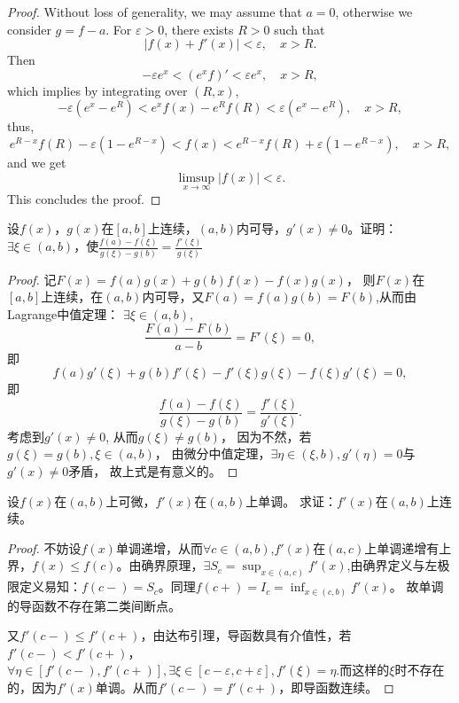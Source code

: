   \begin{proof}
    Without loss of generality, we may assume that $a=0$, otherwise we consider $g=f-a$.
  For $\varepsilon>0$, there exists $R>0$ such that 
  \[
  |f(x)+f'(x)| < \varepsilon,\quad x>R.
  \]
  Then 
  \[
  -\varepsilon e^x < \left(e^xf\right)' < \varepsilon e^x,\quad x>R,
  \]
  which implies by integrating over $(R, x)$,
  \[
  -\varepsilon (e^x - e^R) < e^xf(x) - e^Rf(R) < \varepsilon(e^x-e^R),\quad x>R,
  \]
  thus,
  \[
  e^{R-x}f(R) - \varepsilon(1-e^{R-x}) < f(x) < e^{R-x}f(R) + \varepsilon(1-e^{R-x}), \quad x>R,
  \]
  and we get 
  \[
  \limsup_{x\to\infty}|f(x)| < \varepsilon.
  \]
  This concludes the proof.
  \end{proof}

  \begin{example}
   设$f(x)$，$g(x)$在$[a,b]$上连续，$(a,b)$内可导，$g'(x)\neq0$。证明：$\exists\xi\in(a,b)$，使$\frac{f(a)-f(\xi)}{g(\xi)-g(b)}=\frac{f'(\xi)}{g(\xi)}$
  \end{example}
  
  \begin{proof}
  记$F(x)=f(a)g(x)+g(b)f(x)-f(x)g(x)$，
  则$F(x)$在$[a,b]$上连续，在$(a,b)$内可导，又$F(a)=f(a)g(b)=F(b)$,从而由Lagrange中值定理：
  $\exists\xi\in(a,b)$,
  \begin{equation*}
    \frac{F(a)-F(b)}{a-b}=F'(\xi)=0,
  \end{equation*}
  即
  \begin{equation*}
    f(a)g'(\xi)+g(b)f'(\xi)-f'(\xi)g(\xi)-f(\xi)g'(\xi)=0,
  \end{equation*}
  即
  \begin{equation*}
    \frac{f(a)-f(\xi)}{g(\xi)-g(b)}=\frac{f'(\xi)}{g'(\xi)}.
  \end{equation*}
  考虑到$g'(x)\neq 0$, 
  从而$g(\xi)\neq g(b)$，
  因为不然，若$g(\xi)=g(b),\xi\in(a,b)$，
  由微分中值定理，$\exists\eta\in(\xi,b),g'(\eta)=0$与$g'(x)\neq0$矛盾，
  故上式是有意义的。
  \end{proof}
  
  \begin{example}
   设$f(x)$在$(a,b)$上可微，$f'(x)$在$(a,b)$上单调。
   求证：$f'(x)$在$(a,b)$上连续。
  \end{example}
  
  \begin{proof}
  不妨设$f(x)$单调递增，从而$\forall c\in(a,b)$,$f'(x)$在$(a,c)$上单调递增有上界，$f(x)\leq f(c)$。由确界原理，$\exists S_c=\sup_{x\in(a,c)}f'(x)$,由确界定义与左极限定义易知：$f(c-)=S_c$。同理$f(c+)=I_c=\inf_{x\in(c,b)}f'(x)$。
  故单调的导函数不存在第二类间断点。
  
  又$f'(c-)\leq f'(c+)$，由达布引理，导函数具有介值性，若$f'(c-)<f'(c+)$，$\forall\eta\in[f'(c-),f'(c+)],\exists\xi\in[c-\varepsilon,c+\varepsilon],f'(\xi)=\eta.$而这样的$\xi$时不存在的，因为$f'(x)$单调。从而$f'(c-)=f'(c+)$，即导函数连续。
  \end{proof} 

